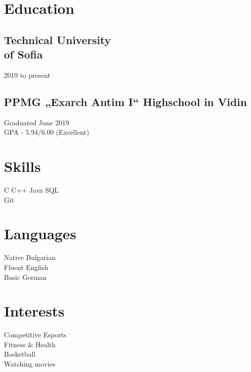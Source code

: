 \documentclass[]{resume}
\begin{document}
\hfill
%
%
\begin{minipage}[t]{0.30\textwidth} 


\section{Education} 

\subsection*{Technical University \\ of Sofia}
2019 to present
\sectionsep
\sectionsep
\subsection*{PPMG „Exarch Antim I“ Highschool in Vidin}
Graduated June 2019\\
GPA - 5.94/6.00 (Excellent)\\
\sectionsep


\section{Skills}
C \textbullet{} C++ \textbullet{} Java \textbullet{} SQL\\
Git 

\sectionsep

\section{Languages}
Native Bulgarian\\
Fluent English\\
Basic German

\sectionsep

\section{Interests}

Competitive Esports\\
Fitness \& Health\\
Basketball\\
Watching movies\\

\end{minipage}
\end{document}
